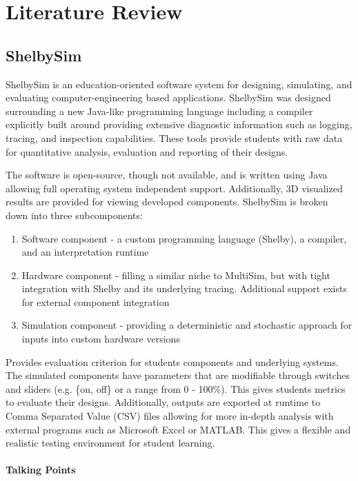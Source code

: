 \chapter{Literature Review}

\section{ShelbySim \cite{Tappan2009}}

ShelbySim is an education-oriented software system for designing, simulating, and evaluating computer-engineering based applications. ShelbySim was designed surrounding a new Java-like programming language including a compiler explicitly built around providing extensive diagnostic information such as logging, tracing, and inspection capabilities. These tools provide students with raw data for quantitative analysis, evaluation and reporting of their designs. 

The software is open-source, though not available, and is written using Java allowing full operating system independent support. Additionally, 3D visualized results are provided for viewing developed components. ShelbySim is broken down into three subcomponents:
\begin{enumerate}
\item Software component - a custom programming language (Shelby), a compiler, and an interpretation runtime
\item Hardware component - filling a similar niche to MultiSim, but with tight integration with Shelby and its underlying tracing. Additional support exists for external component integration
\item Simulation component - providing a deterministic and stochastic approach for inputs into custom hardware versions
\end{enumerate} 

Provides evaluation criterion for students components and underlying systems. The simulated components have parameters that are modifiable through switches and sliders (e.g. \{on, off\} or a range from 0 - 100\%). This gives students metrics to evaluate their designs. Additionally, outputs are exported at runtime to Comma Separated Value (CSV) files allowing for more in-depth analysis with external programs such as Microsoft Excel or MATLAB. This gives a flexible and realistic testing environment for student learning. 

\subsubsection{Talking Points}

